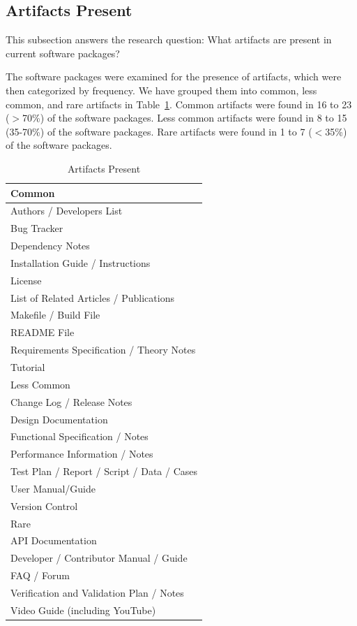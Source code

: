 \documentclass[final, 3p, times, authoryear]{elsarticle}
\begin{document}
\subsection{Artifacts Present} \label{artifacts}

This subsection answers the research question: What artifacts are present in
current software packages?

The software packages were examined for the presence of artifacts, which were
then categorized by frequency. We have grouped them into common, less common,
and rare artifacts in Table~\ref{artifactspresent}. Common artifacts were found
in 16 to 23 ($>$70\%) of the software packages. Less common artifacts were found
in 8 to 15 (35-70\%) of the software packages. Rare artifacts were found in 1 to
7 ($<$35\%) of the software packages. 

\begin{table}
	\begin{center}
		\begin{tabular}{ p{8 cm} }
			\hline
			Common\\
			\hline
			Authors / Developers List\\
			Bug Tracker\\
			Dependency Notes\\
			Installation Guide / Instructions\\
			License\\
			List of Related Articles / Publications\\
			Makefile / Build File\\
			README File\\
			Requirements Specification / Theory Notes\\
			Tutorial\\
			\hline
			Less Common\\
			\hline
			Change Log / Release Notes\\
			Design Documentation\\
			Functional Specification / Notes\\
			Performance Information / Notes\\
			Test Plan / Report / Script / Data / Cases\\
			User Manual/Guide\\
			Version Control\\
			\hline
			Rare\\
			\hline
			API Documentation\\
			Developer / Contributor Manual / Guide\\
			FAQ / Forum\\
			Verification and Validation Plan / Notes\\
			Video Guide (including YouTube)\\
			\hline
		\end{tabular}
		\caption{Artifacts Present} \label{artifactspresent}
	\end{center}
\end{table}
\end{document}
